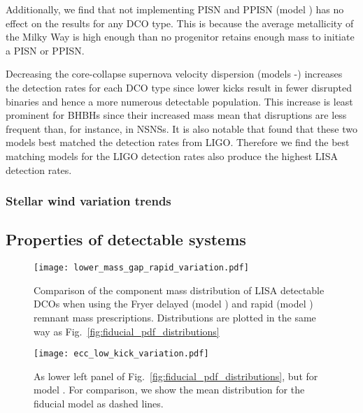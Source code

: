 Additionally, we find that not implementing PISN and PPISN (model \modNoPISN{}) has no effect on the results for any DCO type. This is because the average metallicity of the Milky Way is high enough than no progenitor retains enough mass to initiate a PISN or PPISN.

Decreasing the core-collapse supernova velocity dispersion (models \modSigLow{}-\modSigLower{}) increases the detection rates for each DCO type since lower kicks result in fewer disrupted binaries and hence a more numerous detectable population. This increase is least prominent for BHBHs since their increased mass mean that disruptions are less frequent than, for instance, in NSNSs. It is also notable that \citet{Broekgaarden+2021} found that these two models best matched the detection rates from LIGO. Therefore we find the best matching models for the LIGO detection rates also produce the highest LISA detection rates.


\subsubsection{Stellar wind variation trends}
\todo{}

\subsection{Properties of detectable systems}\label{sec:property_variations}

\begin{figure}[htb]
    \centering
    \texttt{[image: lower\_mass\_gap\_rapid\_variation.pdf]}
    \caption{Comparison of the component mass distribution of LISA detectable DCOs when using the Fryer delayed (model \modFid{}) and rapid (model \modRapid{}) remnant mass prescriptions. Distributions are plotted in the same way as Fig.~\ref{fig:fiducial_pdf_distributions}}
    \label{fig:lower_mass_gap_variation}
\end{figure}

\begin{figure}[htb]
    \centering
    \texttt{[image: ecc\_low\_kick\_variation.pdf]}
    \caption{As lower left panel of Fig.~\ref{fig:fiducial_pdf_distributions}, but for model \modSigLower{}. For comparison, we show the mean distribution for the fiducial model as dashed lines.}
    \label{fig:ecc_low_kick_variation}
\end{figure}


